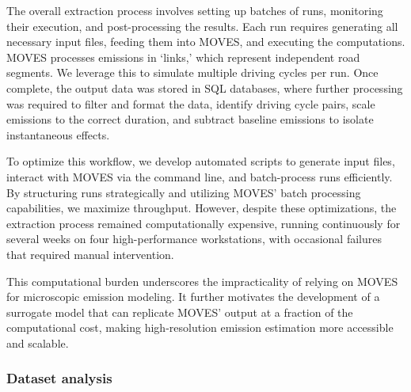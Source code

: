 \documentclass[12pt,english]{article}
\begin{document}
The overall extraction process involves setting up batches of runs, monitoring their execution, and post-processing the results. Each run requires generating all necessary input files, feeding them into MOVES, and executing the computations. MOVES processes emissions in `links,' which represent independent road segments. We leverage this to simulate multiple driving cycles per run. Once complete, the output data was stored in SQL databases, where further processing was required to filter and format the data, identify driving cycle pairs, scale emissions to the correct duration, and subtract baseline emissions to isolate instantaneous effects.


To optimize this workflow, we develop automated scripts to generate input files, interact with MOVES via the command line, and batch-process runs efficiently. By structuring runs strategically and utilizing MOVES' batch processing capabilities, we maximize throughput. However, despite these optimizations, the extraction process remained computationally expensive, running continuously for several weeks on four high-performance workstations, with occasional failures that required manual intervention.

This computational burden underscores the impracticality of relying on MOVES for microscopic emission modeling. It further motivates the development of a surrogate model that can replicate MOVES' output at a fraction of the computational cost, making high-resolution emission estimation more accessible and scalable.




\subsubsection{Dataset analysis}
\end{document}
